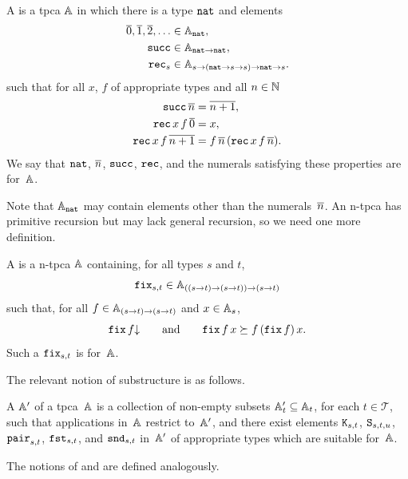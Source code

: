 \begin{definition}
  A  is a tpca $\AA$ in which there is a
  type $\ttnat$ and elements
  \begin{align*}
    \numeral{0}, \numeral{1}, \numeral{2}, \ldots &\in \AA_{\ttnat}, \\
    \combSucc &\in \AA_{\ttnat \to \ttnat}, \\
    \combRec_s &\in \AA_{s \to (\ttnat \to s \to s) \to \ttnat \to s}.
  \end{align*}
  such that for all $x$, $f$ of appropriate types and all $n \in \NN$
  \begin{align*}
    \combSucc \, \numeral{n} &= \numeral{n + 1}, \\
    \combRec \, x \, f \, \numeral{0} &= x, \\
    \combRec \, x \, f \, \numeral{n+1} &=
                                          f \, \numeral{n} \, (\combRec \, x \, f \, \numeral{n}).
  \end{align*}
  We say that $\ttnat$, $\numeral{n}$, $\combSucc$, $\combRec$, and the numerals satisfying these properties are  for~$\AA$.
\end{definition}

Note that $\AA_\ttnat$ may contain elements other than the numerals~$\numeral{n}$.
An n-tpca has primitive recursion but may lack general recursion, so we need one more definition.

\begin{definition}
  A  is a
  n-tpca $\AA$ containing, for all types $s$ and $t$,
  \begin{equation*}
    \combFix_{s,t} \in \AA_{((s \to t) \to (s \to t)) \to (s \to t)}
  \end{equation*}
  such that, for all $f \in \AA_{(s \to t) \to (s \to t)}$ and $x \in \AA_s$,
  \begin{equation*}
    \defined{\combFix \, f}
    \qquad\text{and}\qquad
    \combFix \, f \, x \klgeq f \, (\combFix\, f) \, x.
  \end{equation*}
  Such a $\combFix_{s,t}$ is  for~$\AA$.
\end{definition}

The relevant notion of substructure is as follows.

\begin{definition}
  A  $\subAA$ of a tpca~$\AA$ is a collection of non-empty
  subsets $\subAA_t \subseteq \AA_t$, for each $t \in \mathcal{T}$, such that
  applications in~$\AA$ restrict to~$\subAA$, and there exist elements
  $\combK_{s,t}$, $\combS_{s,t,u}$, $\combPair_{s,t}$, $\combFst_{s,t}$,
  and $\combSnd_{s,t}$ in~$\subAA$ of
  appropriate types which are suitable for~$\AA$.

  The notions of 
  and  are defined analogously.
\end{definition}

